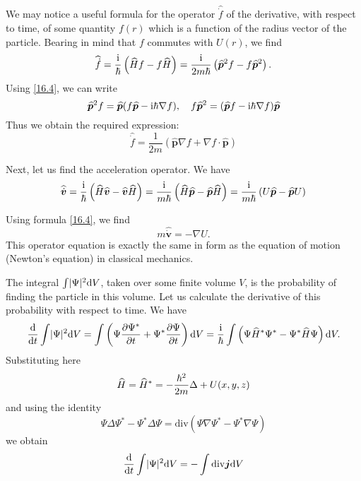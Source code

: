 We may notice a useful formula for the operator $ \hat{\dot{f}} $ of the derivative, with respect to time, of some quantity $ f(r) $ which is a function of the radius vector of the particle. Bearing in mind that $ f $ commutes with $ U(r) $, we find
\[ \widehat{\dot{f}}=\frac{\mathrm{i}}{\hbar}\left(  \widehat{H}f-f\widehat{H} \right)=\frac{\mathrm{i}}{2m\hbar}\left( \widehat{\bm{p}}^2f-f\widehat{\bm{p}}^2\right). \]
Using \eqref{16.4}, we can write
\[ \widehat{\bm{p}}^2f=\widehat{\bm{p}}(f\widehat{\bm{p}}-\mathrm{i}\hbar\nabla f),\quad f\widehat{\bm{p}}^2=(\widehat{\bm{p}}f-\mathrm{i}\hbar\nabla f)\widehat{\bm{p}} \]
Thus we obtain the required expression:
\begin{equation}\label{19.2}
\hat{\dot{f}}=\frac{1}{2m}\left(\hat{\bm{p}}\nabla f+\nabla f\cdot\hat{\bm{p}} \right)
\end{equation}


Next, let us find the acceleration operator. We have
\[ \widehat{\dot{\bm{v}}}=\frac{\mathrm{i}}{\hbar}\left(\widehat{H}\widehat{\bm{v}}-\widehat{\bm{v}}\widehat{H} \right)=\frac{\mathrm{i}}{m\hbar}\left( \widehat{H}\widehat{\bm{p}}-\widehat{\bm{p}}\widehat{H}\right)=\frac{\mathrm{i}}{m\hbar}\left( U\widehat{\bm{p}}-\widehat{\bm{p}}U\right) \]



Using formula \eqref{16.4}, we find
\begin{equation}\label{19.3}
m\hat{\dot{\bm{v}}}=-\nabla U.
\end{equation}
This operator equation is exactly the same in form as the equation of motion (Newton’s equation) in classical mechanics.

The integral $ \int\lvert\Psi\rvert^2\mathrm{d} V $, taken over some finite volume $ V $, is the probability of finding the particle in this volume. Let us calculate the derivative of this probability with respect to time. We have
\[ \frac{\mathrm{d}}{\mathrm{d} t}\int\lvert\Psi\rvert^2\mathrm{d} V=\int\left(\Psi\frac{\partial\Psi^*}{\partial t}+\Psi^*\frac{\partial\Psi}{\partial t} \right)\mathrm{d} V=\frac{\mathrm{i}}{\hbar}\int\left( \Psi\widehat{H}^*\Psi^*-\Psi^*\widehat{H}\Psi \right)\mathrm{d} V. \]
Substituting here
\[ \widehat{H}=\widehat{H}^*=-\frac{\hbar^2}{2m}\Delta+U(x,y,z) \]
and using the identity
\[ \Psi\Delta\Psi^*-\Psi^*\Delta\Psi=\mathrm{div}\left(\Psi\nabla\Psi^*-\Psi^*\nabla\Psi \right) \]
we obtain
\[ \frac{\mathrm{d}}{\mathrm{d} t}\int\lvert\Psi\rvert^2\mathrm{d} V=-\int\mathrm{div}\bm{j}\mathrm{d} V \]



